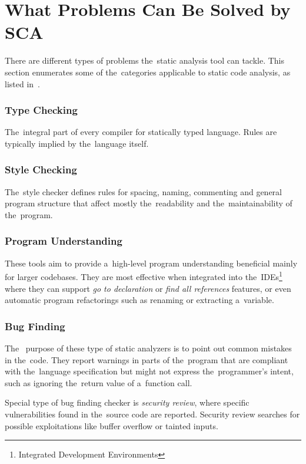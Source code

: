 \documentclass[
  digital, %
  table,   %
  lof,     %
  lot,     %
  oneside,
]{fithesis3}
\begin{document}
\section{What Problems Can Be Solved by SCA}
There are different types of problems the~static analysis tool can tackle. This section enumerates some of the~categories applicable to static code analysis, as listed in~\cite{secure-programming-with-sca}.

\subsubsection{\textbf{Type Checking}}
The~integral part of every compiler for statically typed language. Rules are typically implied by the~language itself.

\subsubsection{\textbf{Style Checking}}
The~style checker defines rules for spacing, naming, commenting and general program structure that affect mostly the~readability and the~maintainability of the~program. 

\subsubsection{\textbf{Program Understanding}}
These tools aim to provide a~high-level program understanding beneficial mainly for larger codebases. They are most effective when integrated into the~IDEs\footnote{Integrated Development Environments} where they can support \textit{go to declaration} or \textit{find all references} features, or even automatic program refactorings such as renaming or extracting a~variable.

\subsubsection{\textbf{Bug Finding}}
The~ purpose of these type of static analyzers is to point out common mistakes in the~code. They report warnings in parts of the~program that are compliant with the~language specification but might not express the~programmer's intent, such as ignoring the~return value of a~function call.

Special type of bug finding checker is \textit{security review}, where specific vulnerabilities found in the~source code are reported. Security review searches for possible exploitations like buffer overflow or tainted inputs.
  
\end{document}
